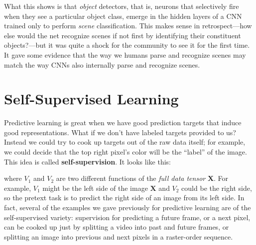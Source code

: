 What this shows is that \textit{object} detectors, that is, neurons that selectively fire when they see a particular object class, emerge in the hidden layers of a CNN trained only to perform \textit{scene} classification. This makes sense in retrospect—how else would the net recognize scenes if not first by identifying their constituent objects?—but it was quite a shock for the community to see it for the first time. It gave some evidence that the way we humans parse and recognize scenes may match the way CNNs also internally parse and recognize scenes.

\section{Self-Supervised Learning}
Predictive learning is great when we have good prediction targets that induce good representations. What if we don't have labeled targets provided to us? Instead we could try to cook up targets out of the raw data itself; for example, we could decide that the top right pixel's color will be the ``label'' of the image. This idea is called \textbf{self-supervision}. It looks like this:
\begin{center}
\end{center}
where $V_1$ and $V_2$ are two different functions of the \textit{full data tensor} $\mathbf{X}$. For example, $V_1$ might be the left side of the image $\mathbf{X}$ and $V_2$ could be the right side, so the pretext task is to predict the right side of an image from its left side. In fact, several of the examples we gave previously for predictive learning are of the self-supervised variety: supervision for predicting a future frame, or a next pixel, can be cooked up just by splitting a video into past and future frames, or splitting an image into previous and next pixels in a raster-order sequence. 

